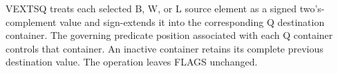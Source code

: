 VEXTSQ treats each selected B, W, or L source element as a signed two's-complement
value and sign-extends it into the corresponding Q destination container.  The
governing predicate position associated with each Q container controls that
container.  An inactive container retains its complete previous destination
value.  The operation leaves FLAGS unchanged.
